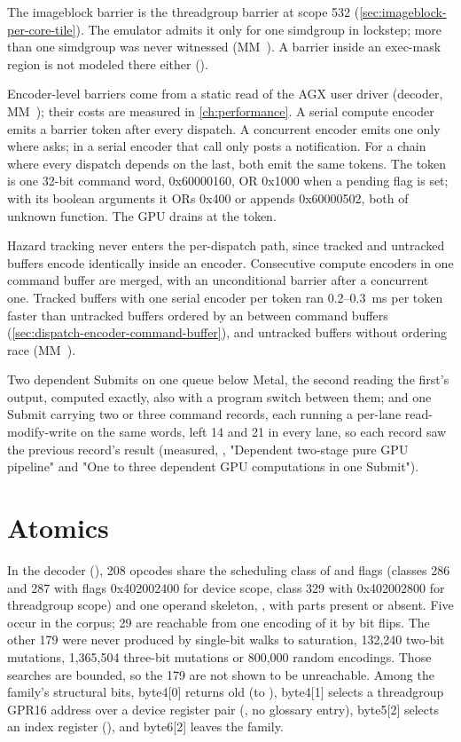 The imageblock barrier is the threadgroup barrier at scope 532 (\cref{sec:imageblock-per-core-tile}). The emulator admits it only for one simdgroup in
lockstep; more than one simdgroup was never witnessed (MM~). A barrier inside an exec-mask region is not modeled
there either ().

Encoder-level barriers come from a static read of the AGX user driver (decoder, MM~); their costs are measured
in \cref{ch:performance}. A serial compute encoder emits a barrier token after every dispatch. A concurrent encoder emits
one only where  asks; in a serial encoder that call only posts a notification. For a chain
where every dispatch depends on the last, both emit the same tokens. The token is one 32-bit command word, 0x60000160, OR
0x1000 when a pending flag is set; with its boolean arguments it ORs 0x400 or appends 0x60000502, both of unknown
function. The GPU drains at the token.

Hazard tracking never enters the per-dispatch path, since tracked and untracked buffers encode identically inside an
encoder. Consecutive compute encoders in one command buffer are merged, with an unconditional barrier after a concurrent
one. Tracked buffers with one serial encoder per token ran 0.2--0.3~ms per token faster than untracked buffers ordered by
an  between command buffers (\cref{sec:dispatch-encoder-command-buffer}), and untracked buffers
without ordering race (MM~).

Two dependent Submits on one queue below Metal, the second reading the first's output, computed exactly, also with a
program switch between them; and one Submit carrying two or three command records, each running a per-lane 
read-modify-write on the same words, left 14 and 21 in every lane, so each record saw the previous record's result
(measured, , "Dependent two-stage pure GPU pipeline" and "One to three dependent GPU
computations in one Submit").

\section{Atomics}\label{sec:atomics}

In the decoder (), 208 opcodes share the scheduling class of  and flags
(classes 286 and 287 with flags 0x402002400 for device scope, class 329 with 0x402002800 for threadgroup scope) and one
operand skeleton, , with parts present or absent. Five occur
in the corpus; 29 are reachable from one encoding of it by bit flips. The other 179 were never produced by single-bit
walks to saturation, 132,240 two-bit mutations, 1,365,504 three-bit mutations or 800,000 random encodings. Those
searches are bounded, so the 179 are not shown to be unreachable. Among the family's structural bits, byte4{[}0{]} returns old (to ), byte4{[}1{]} selects a threadgroup GPR16 address over a device register pair (, no glossary entry),
byte5{[}2{]} selects an index register (), and byte6{[}2{]} leaves the family.

